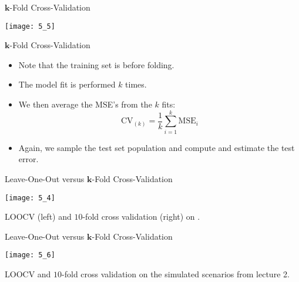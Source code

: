 \documentclass[mathserif, aspectratio=169]{beamer}
\begin{document}
\begin{frame}{$\bm{k}$-Fold Cross-Validation}
	\begin{center}
		\texttt{[image: 5\_5]}
	\end{center}
\end{frame}

\begin{frame}{$\bm{k}$-Fold Cross-Validation}
	\begin{itemize}
		\item Note that the training set is  before folding.
		\item The model fit is performed $k$ times.
		\item We then average the MSE's from the $k$ fits:
			\[ 
				\text{CV}_{(k)} = 
				\frac{1}{k}\sum_{i=1}^{k} \text{MSE}_i
			\]
		\item Again, we sample the test set population and compute and estimate
			the test error.
	\end{itemize}
\end{frame}

\begin{frame}{Leave-One-Out versus $\bm{k}$-Fold Cross-Validation}
	\begin{center}
		\texttt{[image: 5\_4]}

		LOOCV (left) and $10$-fold cross validation (right) on .
	\end{center}
\end{frame}

\begin{frame}{Leave-One-Out versus $\bm{k}$-Fold Cross-Validation}
	\begin{center}
		\texttt{[image: 5\_6]}

		LOOCV and $10$-fold cross validation on the simulated scenarios from lecture 2.
	\end{center}
\end{frame}
\end{document}
